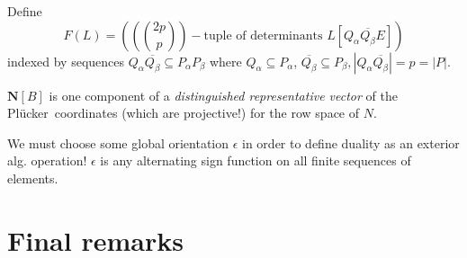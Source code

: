 \documentclass[Unicode]{cedram-alco}
\newcommand{\ext}[1]{\ensuremath{\mathbf{#1}}}
\newcommand{\Plucker}{Pl\"{u}cker\ }
\begin{document}
  Define
  \[
  F(L)=((\binom{2p}{p})-\text{tuple of determinants\ } L[Q_\alpha\overline{Q_\beta}E])
  \]
  indexed by sequences $Q_\alpha \overline{Q_\beta} \subseteq P_\alpha P_\beta$ where
  $Q_\alpha\subseteq P_\alpha$, $\overline{Q_\beta}\subseteq P_\beta, |Q_\alpha \overline{Q_\beta}|=p=|P|$.







$\ext{N}[B]$ is one component of a \emph{distinguished representative
vector} of the \Plucker coordinates (which are projective!) for the
row space of $N$.



We must choose some global orientation $\epsilon$ in order to define
duality as an exterior alg. operation!  $\epsilon$ is any alternating
sign function on all finite sequences of elements.\\



\section{Final remarks}





\end{document}
